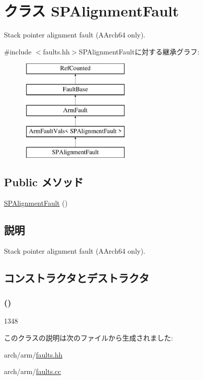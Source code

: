\hypertarget{classArmISA_1_1SPAlignmentFault}{
\section{クラス SPAlignmentFault}
\label{classArmISA_1_1SPAlignmentFault}
}


Stack pointer alignment fault (AArch64 only).  


{\ttfamily \#include $<$faults.hh$>$}SPAlignmentFaultに対する継承グラフ:\begin{figure}[H]
\begin{center}
\leavevmode
\includegraphics[height=5cm]{classArmISA_1_1SPAlignmentFault}
\end{center}
\end{figure}
\subsection*{Public メソッド}
\begin{DoxyCompactItemize}
\item 
\hyperlink{classArmISA_1_1SPAlignmentFault_adbc2f2be4c75b0addbc237176d2daed6}{SPAlignmentFault} ()
\end{DoxyCompactItemize}


\subsection{説明}
Stack pointer alignment fault (AArch64 only). 

\subsection{コンストラクタとデストラクタ}
\hypertarget{classArmISA_1_1SPAlignmentFault_adbc2f2be4c75b0addbc237176d2daed6}{
\subsubsection[{SPAlignmentFault}]{ ()}}
\label{classArmISA_1_1SPAlignmentFault_adbc2f2be4c75b0addbc237176d2daed6}



\begin{DoxyCode}
1348 {}
\end{DoxyCode}


このクラスの説明は次のファイルから生成されました:\begin{DoxyCompactItemize}
\item 
arch/arm/\hyperlink{arch_2arm_2faults_8hh}{faults.hh}\item 
arch/arm/\hyperlink{arch_2arm_2faults_8cc}{faults.cc}\end{DoxyCompactItemize}
